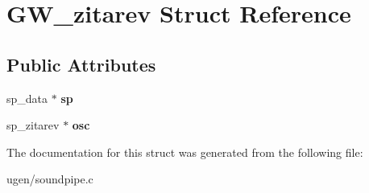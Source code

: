 \hypertarget{structGW__zitarev}{}\section{G\+W\+\_\+zitarev Struct Reference}
\label{structGW__zitarev}
\subsection*{Public Attributes}
\begin{DoxyCompactItemize}
\item 
\hypertarget{structGW__zitarev_a86f6ade8cc0168ae1835b731a9c71b83}{}\label{structGW__zitarev_a86f6ade8cc0168ae1835b731a9c71b83} 
sp\+\_\+data $\ast$ {\bfseries sp}
\item 
\hypertarget{structGW__zitarev_a327dce87c7e62ec190eb92298fc62627}{}\label{structGW__zitarev_a327dce87c7e62ec190eb92298fc62627} 
sp\+\_\+zitarev $\ast$ {\bfseries osc}
\end{DoxyCompactItemize}


The documentation for this struct was generated from the following file\+:\begin{DoxyCompactItemize}
\item 
ugen/soundpipe.\+c\end{DoxyCompactItemize}
